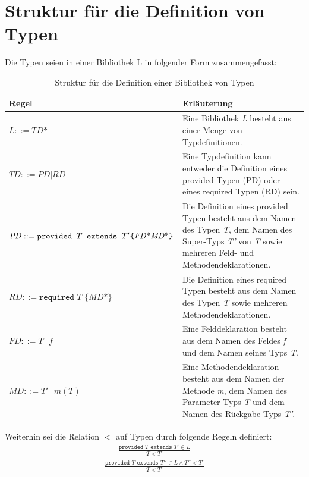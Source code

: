 \documentclass[a4paper,12pt]{article}
\begin{document}
\section{Struktur für die Definition von Typen}\label{sec:strukturTypen}
Die Typen seien in einer Bibliothek $\text{L}$ in folgender Form zusammengefasst:
\begin{table}[H]
\centering
\begin{tabular}{|p{5.5cm}|p{8.5cm}|}
\hline
\hline
\centering\textbf{Regel} & \textbf{Erläuterung} \\
\hline
\hline
$\mathit{L} ::= \mathit{TD}\text{*}$ & Eine Bibliothek \emph{L} besteht aus einer Menge von Typdefinitionen.\\
\hline
$\mathit{TD} ::= \mathit{PD} | \mathit{RD}$ & Eine Typdefinition kann entweder die Definition eines provided Typen (PD) oder eines required Typen (RD) sein.\\
\hline
$\mathit{PD} ::= \newline\texttt{provided }T \texttt{ extends } T' \newline  \texttt{\{} \mathit{FD}\text{*} \mathit{MD}\text{*}\texttt{\}}$& Die Definition eines provided Typen besteht aus dem Namen des Typen \emph{T}, dem Namen des Super-Typs \emph{T'} von \emph{T} sowie mehreren Feld- und Methodendeklarationen.\\
\hline
$\mathit{RD} ::= \texttt{required } T \texttt{ \{}\mathit{MD}\text{*}\texttt{\}}$ & Die Definition eines required Typen besteht aus dem Namen des Typen \emph{T} sowie mehreren Methodendeklarationen.\\
\hline
$\mathit{FD} ::= T \texttt{ }\mathit{f}$ & Eine Felddeklaration besteht aus dem Namen des Feldes \emph{f} und dem Namen seines Typs \emph{T}.\\
\hline
$\mathit{MD} ::= \mathit{T'}\texttt{ }\mathit{m(T)}$ & Eine Methodendeklaration besteht aus dem Namen der Methode \emph{m}, dem Namen des Parameter-Typs \emph{T} und dem Namen des Rückgabe-Typs \emph{T'}.\\
\hline
\hline
\end{tabular}
\caption{Struktur für die Definition einer Bibliothek von Typen}
 \label{tab:eIShort}
\end{table}
\noindent
Weiterhin sei die Relation $<$ auf Typen durch folgende Regeln definiert:
\begin{gather*}
\frac{\texttt{provided }T \texttt{ extends } T' \in L}{T < T'}
\end{gather*}
\begin{gather*}
\frac{\texttt{provided } T \texttt{ extends } T'' \in L \wedge T'' < T'}{T < T'}
\end{gather*}
\end{document}
